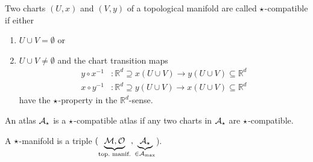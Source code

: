 \documentclass[11pt, a4paper, twocolumn]{article} %
\begin{document}
\begin{defn}
    Two charts $(U, x)$ and $(V, y)$ of a topological manifold are called $\star$-compatible if
    either
    \begin{enumerate}
        \item $U\cup V = \emptyset$ or
        \item $U\cup V \neq \emptyset$ and the chart transition maps
            \begin{align*}
                y\circ x^{-1}&:\mathbb{R}^d\supseteq x(U\cup V) \to y(U\cup V) \subseteq \mathbb{R}^d \\
                x\circ y^{-1}&: \mathbb{R}^d\supseteq y(U\cup V) \to x(U\cup V) \subseteq \mathbb{R}^d
            \end{align*}
            have the $\star$-property in the $\mathbb{R}^d$-sense.
    \end{enumerate}
\end{defn}

\begin{defn}
    An atlas $\mathcal{A}_\star$ is a $\star$-compatible atlas if any two charts in
    $\mathcal{A}_\star$ are $\star$-compatible.
\end{defn}

\begin{defn}
    A $\star$-manifold is a triple $(\underbrace{\M, \mathcal{O}}_{\text{top.\ manif.}}, 
    \underbrace{\mathcal{A}_\flower}_{\in \mathcal{A}_\text{max}}$).
\end{defn}
\end{document}
